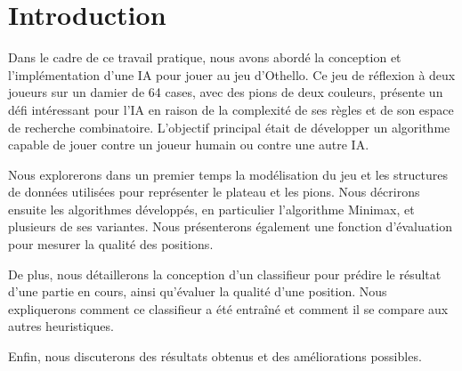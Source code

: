 \chapter{Introduction}
\label{chap:introduction}
Dans le cadre de ce travail pratique, nous avons abordé la conception et l'implémentation d'une \ac{IA} pour jouer au jeu d'Othello. Ce jeu de réflexion à deux joueurs sur un damier de 64 cases, avec des pions de deux couleurs, présente un défi intéressant pour l'IA en raison de la complexité de ses règles et de son espace de recherche combinatoire. L'objectif principal était de développer un algorithme capable de jouer contre un joueur humain ou contre une autre IA.

Nous explorerons dans un premier temps la modélisation du jeu et les structures de données utilisées pour représenter le plateau et les pions. Nous décrirons ensuite les algorithmes développés, en particulier l'algorithme Minimax, et plusieurs de ses variantes. Nous présenterons également une fonction d'évaluation pour mesurer la qualité des positions.

De plus, nous détaillerons la conception d'un classifieur pour prédire le résultat d'une partie en cours, ainsi qu'évaluer la qualité d'une position. Nous expliquerons comment ce classifieur a été entraîné et comment il se compare aux autres heuristiques.

Enfin, nous discuterons des résultats obtenus et des améliorations possibles.

